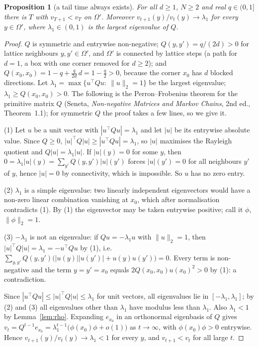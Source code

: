 \documentclass[11pt,a4paper]{article}
\newtheorem{proposition}[theorem]{Proposition}
\theoremstyle{definition}
\theoremstyle{remark}
\begin{document}
\begin{proposition}[a tail time always exists]\label{prop:termination}
For all $d\ge1$, $N\ge2$ and real $q\in(0,1]$ there is $T$ with $v_{T+1}<v_T$ on $\Omega'$. Moreover $v_{t+1}(y)/v_t(y)\to\lambda_1$ for every $y\in\Omega'$, where $\lambda_1\in(0,1)$ is the largest eigenvalue of $Q$.
\end{proposition}
\begin{proof}
$Q$ is symmetric and entrywise non-negative; $Q(y,y')=q/(2d)>0$ for lattice neighbours $y,y'\in\Omega'$, and $\Omega'$ is connected by lattice steps (a path for $d=1$, a box with one corner removed for $d\ge2$); and $Q(x_0,x_0)=1-q+\frac{q}{2d}\,d=1-\frac q2>0$, because the corner $x_0$ has $d$ blocked directions. Let $\lambda_1=\max\{u^{\!\top}Qu:\ \|u\|_2=1\}$ be the largest eigenvalue; $\lambda_1\ge Q(x_0,x_0)>0$. The following is the Perron--Frobenius theorem for the primitive matrix $Q$ (Seneta, \emph{Non-negative Matrices and Markov Chains}, 2nd ed., Theorem~1.1); for symmetric $Q$ the proof takes a few lines, so we give it.

(1) Let $u$ be a unit vector with $|u^{\!\top}Qu|=\lambda_1$ and let $|u|$ be its entrywise absolute value. Since $Q\ge0$, $|u|^{\!\top}Q|u|\ge|u^{\!\top}Qu|=\lambda_1$, so $|u|$ maximises the Rayleigh quotient and $Q|u|=\lambda_1|u|$. If $|u|(y)=0$ for some $y$, then $0=\lambda_1|u|(y)=\sum_{y'}Q(y,y')|u|(y')$ forces $|u|(y')=0$ for all neighbours $y'$ of $y$, hence $|u|=0$ by connectivity, which is impossible. So $u$ has no zero entry.

(2) $\lambda_1$ is a simple eigenvalue: two linearly independent eigenvectors would have a non-zero linear combination vanishing at $x_0$, which after normalisation contradicts (1). By (1) the eigenvector may be taken entrywise positive; call it $\phi$, $\|\phi\|_2=1$.

(3) $-\lambda_1$ is not an eigenvalue: if $Qu=-\lambda_1u$ with $\|u\|_2=1$, then $|u|^{\!\top}Q|u|=\lambda_1=-u^{\!\top}Qu$ by (1), i.e.\ $\sum_{y,y'}Q(y,y')\bigl(|u(y)||u(y')|+u(y)u(y')\bigr)=0$. Every term is non-negative and the term $y=y'=x_0$ equals $2Q(x_0,x_0)u(x_0)^2>0$ by (1): a contradiction.

Since $|u^{\!\top}Qu|\le|u|^{\!\top}Q|u|\le\lambda_1$ for unit vectors, all eigenvalues lie in $[-\lambda_1,\lambda_1]$; by (2) and (3) all eigenvalues other than $\lambda_1$ have modulus less than $\lambda_1$. Also $\lambda_1<1$ by Lemma~\ref{lem:rho}. Expanding $e_{x_0}$ in an orthonormal eigenbasis of $Q$ gives $v_t=Q^{t-1}e_{x_0}=\lambda_1^{t-1}\bigl(\phi(x_0)\phi+o(1)\bigr)$ as $t\to\infty$, with $\phi(x_0)\phi>0$ entrywise. Hence $v_{t+1}(y)/v_t(y)\to\lambda_1<1$ for every $y$, and $v_{t+1}<v_t$ for all large $t$.
\end{proof}
\end{document}
